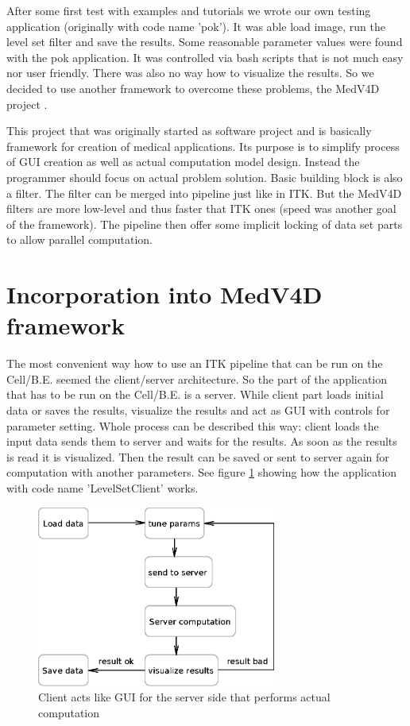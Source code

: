 \par
After some first test with examples and tutorials we wrote our own testing application (originally with code name 'pok').
It was able load image, run the level set filter and save the results.
Some reasonable parameter values were found with the pok application.
It was controlled via bash scripts that is not much easy nor user friendly.
There was also no way how to visualize the results.
So we decided to use another framework to overcome these problems, the MedV4D project \cite{medved}.

\par
This project that was originally started as software project and is basically framework for creation of medical applications.
Its purpose is to simplify process of GUI creation as well as actual computation model design.
Instead the programmer should focus on actual problem solution.
Basic building block is also a filter.
The filter can be merged into pipeline just like in ITK.
But the MedV4D filters are more low-level and thus faster that ITK ones (speed was another goal of the framework).
The pipeline then offer some implicit locking of data set parts to allow parallel computation.

\section{Incorporation into MedV4D framework}

\par
The most convenient way how to use an ITK pipeline that can be run on the Cell/B.E. seemed the client/server architecture.
So the part of the application that has to be run on the Cell/B.E. is a server.
While client part loads initial data or saves the results, visualize the results and act as GUI with controls for parameter setting.
Whole process can be described this way: client loads the input data sends them to server and waits for the results.
As soon as the results is read it is visualized.
Then the result can be saved or sent to server again for computation with another parameters.
See figure \ref{fg:computationProcess} showing how the application with code name 'LevelSetClient' works.

\begin{figure}
    \centering
    \includegraphics[width=0.7\textwidth]{data/computationProcess}
    \caption[LevelSetClient application computation process]{Client acts like GUI for the server side that performs actual computation}
    \label{fg:computationProcess}
\end{figure}

